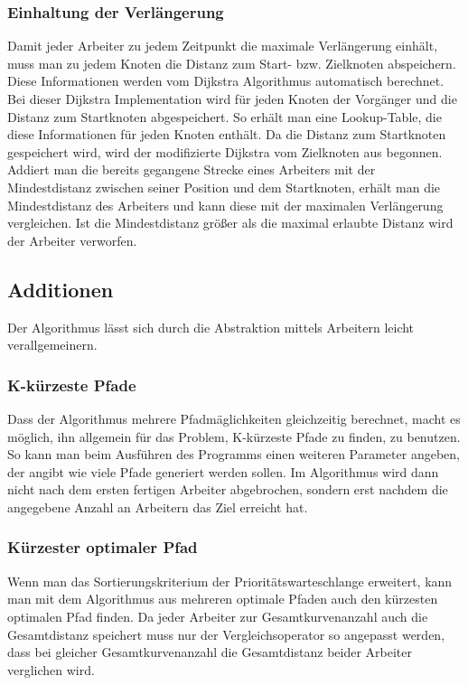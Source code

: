 \documentclass[a4paper,10pt,ngerman]{scrartcl}
\begin{document}
\subsubsection{Einhaltung der Verlängerung}
Damit jeder Arbeiter zu jedem Zeitpunkt die maximale Verlängerung einhält, muss man zu jedem Knoten die Distanz zum Start- bzw. Zielknoten abspeichern.
Diese Informationen werden vom Dijkstra Algorithmus automatisch berechnet.
Bei dieser Dijkstra Implementation wird für jeden Knoten der Vorgänger und die Distanz zum Startknoten abgespeichert.
So erhält man eine Lookup-Table, die diese Informationen für jeden Knoten enthält.
Da die Distanz zum Startknoten gespeichert wird, wird der modifizierte Dijkstra vom Zielknoten aus begonnen.
Addiert man die bereits gegangene Strecke eines Arbeiters mit der Mindestdistanz zwischen seiner Position und dem Startknoten,
erhält man die Mindestdistanz des Arbeiters und kann diese mit der maximalen Verlängerung vergleichen.
Ist die Mindestdistanz größer als die maximal erlaubte Distanz wird der Arbeiter verworfen.

\subsection{Additionen}
Der Algorithmus lässt sich durch die Abstraktion mittels Arbeitern leicht verallgemeinern.

\subsubsection{K-kürzeste Pfade}
Dass der Algorithmus mehrere Pfadmäglichkeiten gleichzeitig berechnet, macht es möglich, ihn allgemein für das Problem, K-kürzeste Pfade zu finden, zu benutzen.
So kann man beim Ausführen des Programms einen weiteren Parameter angeben, der angibt wie viele Pfade generiert werden sollen. Im Algorithmus wird dann nicht
nach dem ersten fertigen Arbeiter abgebrochen, sondern erst nachdem die angegebene Anzahl an Arbeitern das Ziel erreicht hat.

\subsubsection{Kürzester optimaler Pfad}
Wenn man das Sortierungskriterium der Prioritätswarteschlange erweitert,
kann man mit dem Algorithmus aus mehreren optimale Pfaden auch den kürzesten optimalen Pfad finden.
Da jeder Arbeiter zur Gesamtkurvenanzahl auch die Gesamtdistanz speichert muss nur der Vergleichsoperator so angepasst werden,
dass bei gleicher Gesamtkurvenanzahl die Gesamtdistanz beider Arbeiter verglichen wird.
\end{document}
